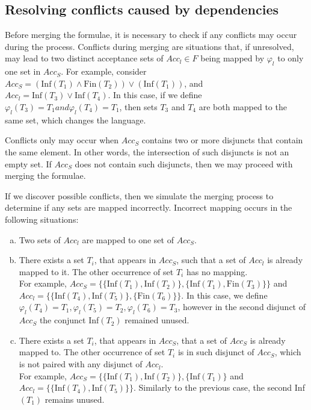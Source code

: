 \documentclass[
  digital, %
  twoside, %
  table,   %
  lof,     %
  lot,     %
]{fithesis3}
\begin{document}
\subsection{Resolving conflicts caused by dependencies}
\label{subsec:resolve_conflicts}
Before merging the formulae, it is necessary to check if any conflicts may occur during the process. Conflicts during merging are situations that, if unresolved, may lead to two distinct acceptance sets of $Acc_l \in F$ being mapped by $\varphi_l$ to only one set in $Acc_S$. For example, consider $Acc_S = (\text{Inf}(T_1) \wedge \text{Fin}(T_2)) \vee (\text{Inf}(T_1))$, and $Acc_l = \text{Inf}(T_3) \vee \text{Inf}(T_4)$. In this case, if we define $\varphi_l (T_3) = T_1 and \varphi_l(T_4) = T_1$, then sets $T_3$ and $T_4$ are both mapped to the same set, which changes the language.   

Conflicts only may occur when $Acc_S$ contains two or more disjuncts that contain the same element. In other words, the intersection of such disjuncts is not an empty set. If $Acc_S$ does not contain such disjuncts, then we may proceed with merging the formulae. 
 
If we discover possible conflicts, then we simulate the merging process to determine if any sets are mapped incorrectly. Incorrect mapping occurs in the following situations:
\begin{enumerate}[a)]
  \item Two sets of $Acc_l$ are mapped to one set of $Acc_S$.
  \item There exists a set $T_i$, that appears in $Acc_S$, such that a set of $Acc_l$ is already mapped to it. The other occurrence of set $T_i$ has no mapping. \\
  For example, $Acc_S = \{\{\text{Inf}(T_1), \text{Inf}(T_2)\}, \{\text{Inf}(T_1), \text{Fin}(T_3)\}\}$ and $Acc_l = \{\{\text{Inf}(T_4), \text{Inf}(T_5)\}, \{\text{Fin}(T_6)\}\}$. In this case, we define $\varphi_l (T_4) = T_1, \varphi_l (T_5) = T_2, \varphi_l (T_6) = T_3$, however in the second disjunct of $Acc_S$ the conjunct Inf$(T_2)$ remained unused.
  \item There exists a set $T_i$, that appears in $Acc_S$, that a set of $Acc_S$ is already mapped to. The other occurrence of set $T_i$ is in such disjunct of $Acc_S$, which is not paired with any disjunct of $Acc_l$. \\
  For example, $Acc_S = \{\{\text{Inf}(T_1), \text{Inf}(T_2)\}, \{\text{Inf}(T_1)\}$ and $Acc_l = \{\{\text{Inf}(T_4), \text{Inf}(T_5)\}\}$. Similarly to the previous case, the second Inf$(T_1)$ remains unused. 
\end{enumerate}
\end{document}
